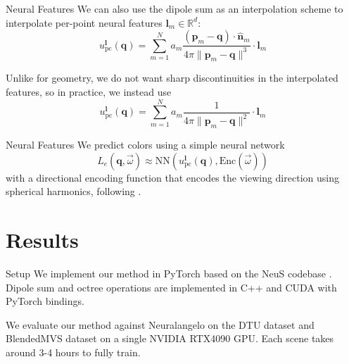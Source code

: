 \documentclass[10pt]{beamer}
\newcommand{\bp}{\mathbf{p}}
\newcommand{\bq}{\mathbf{q}}
\newcommand{\bn}{\mathbf{n}}
\newcommand{\bl}{\mathbf{l}}
\begin{document}
\begin{frame}{Neural Features}
    We can also use the dipole sum as an \alert{interpolation} scheme to interpolate per-point \alert{neural features} \(\bl_m \in \mathbb R^d\):
    \begin{equation*}
        u^\bl_{\mathrm{pc}}(\bq) = \sum_{m=1}^{N} a_m \frac{(\bp_m - \bq) \cdot \widehat{\bn}_m}{4\pi \|\bp_m - \bq\|^3} \cdot \bl_m
    \end{equation*}

    Unlike for geometry, we do not want sharp discontinuities in the interpolated features, so in practice, we instead use
    \begin{equation*}
        u^\bl_{\mathrm{pc}}(\bq) = \sum_{m=1}^{N} a_m \frac{1}{4\pi \|\bp_m - \bq\|^2} \cdot \bl_m
    \end{equation*}
\end{frame}


\begin{frame}{Neural Features}
    We predict colors using a simple neural network
    \begin{equation*}
        L_e(\bq, \vec{\omega}) \approx \mathrm{NN}(u^\bl_{\mathrm{pc}}(\bq), \mathrm{Enc}(\vec{\omega}))
    \end{equation*}
    with a directional encoding function that encodes the viewing direction using spherical harmonics, following \citet{verbin2022refnerf}.
\end{frame}

\section{Results}

\begin{frame}{Setup}
    We implement our method in PyTorch based on the NeuS codebase \citep{wang2021neus}. Dipole sum and octree operations are implemented in C++ and CUDA with PyTorch bindings.

    We evaluate our method against Neuralangelo \citep{li2023neuralangelo} on the DTU dataset \citep{jensen2014large} and BlendedMVS dataset \citep{yao2020blendedmvs} on a single NVIDIA RTX4090 GPU. Each scene takes around 3-4 hours to fully train.
\end{frame}
\end{document}
